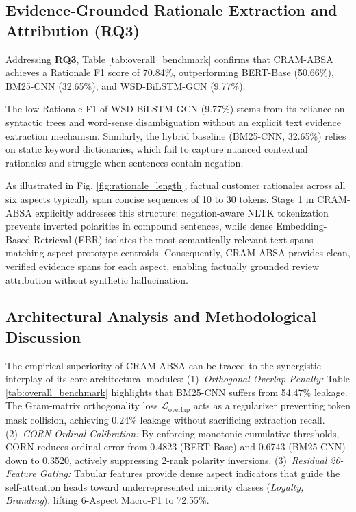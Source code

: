 \documentclass{llncs}
\begin{document}
\subsection{Evidence-Grounded Rationale Extraction and Attribution (RQ3)}
\label{subsec:rq3_commentary_generation}
Addressing \textbf{RQ3}, Table \ref{tab:overall_benchmark} confirms that CRAM-ABSA achieves a Rationale F1 score of 70.84\%, outperforming BERT-Base (50.66\%), BM25-CNN (32.65\%), and WSD-BiLSTM-GCN (9.77\%).

The low Rationale F1 of WSD-BiLSTM-GCN (9.77\%) stems from its reliance on syntactic trees and word-sense disambiguation without an explicit text evidence extraction mechanism. Similarly, the hybrid baseline (BM25-CNN, 32.65\%) relies on static keyword dictionaries, which fail to capture nuanced contextual rationales and struggle when sentences contain negation.

As illustrated in Fig. \ref{fig:rationale_length}, factual customer rationales across all six aspects typically span concise sequences of 10 to 30 tokens. Stage 1 in CRAM-ABSA explicitly addresses this structure: negation-aware NLTK tokenization prevents inverted polarities in compound sentences, while dense Embedding-Based Retrieval (EBR) isolates the most semantically relevant text spans matching aspect prototype centroids. Consequently, CRAM-ABSA provides clean, verified evidence spans for each aspect, enabling factually grounded review attribution without synthetic hallucination.

\subsection{Architectural Analysis and Methodological Discussion}
\label{subsec:architectural_analysis}
The empirical superiority of CRAM-ABSA can be traced to the synergistic interplay of its core architectural modules:
(1)~\textit{Orthogonal Overlap Penalty:} Table \ref{tab:overall_benchmark} highlights that BM25-CNN suffers from 54.47\% leakage. The Gram-matrix orthogonality loss $\mathcal{L}_{\text{overlap}}$ acts as a regularizer preventing token mask collision, achieving 0.24\% leakage without sacrificing extraction recall.
(2)~\textit{CORN Ordinal Calibration:} By enforcing monotonic cumulative thresholds, CORN reduces ordinal error from 0.4823 (BERT-Base) and 0.6743 (BM25-CNN) down to 0.3520, actively suppressing 2-rank polarity inversions.
(3)~\textit{Residual 20-Feature Gating:} Tabular features provide dense aspect indicators that guide the self-attention heads toward underrepresented minority classes (\textit{Loyalty, Branding}), lifting 6-Aspect Macro-F1 to 72.55\%.
\end{document}

